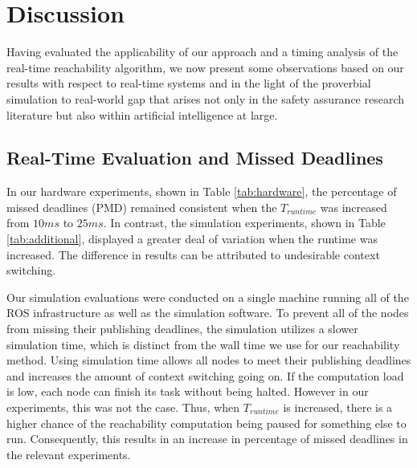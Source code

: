 \documentclass[manuscript,screen,review]{acmart}
\begin{document}
\section{Discussion}

Having evaluated the applicability of our approach and a timing analysis of the real-time reachability algorithm, we now present some observations based on our results with respect to real-time systems and in the light of the proverbial simulation to real-world gap  that arises not only in the safety assurance research literature but also within artificial intelligence at large.



\subsection{Real-Time Evaluation and Missed Deadlines} %

In our hardware experiments, shown in Table \ref{tab:hardware}, the percentage of missed deadlines (PMD) remained consistent when the $T_{runtime}$ was increased from $10ms$ to $25ms$. In contrast, the simulation experiments, shown in Table \ref{tab:additional}, displayed a greater deal of variation when the runtime was increased. The difference in results can be attributed to undesirable context switching. 

Our simulation evaluations were conducted on a single machine running all of the ROS infrastructure as well as the simulation software. To prevent all of the nodes from missing their publishing deadlines, the simulation utilizes a slower simulation time, which is distinct from the wall time we use for our reachability method. Using simulation time allows all nodes to meet their publishing deadlines and increases the amount of context switching going on. If the computation load is low, each node can finish its task without being halted. However in our experiments, this was not the case. Thus, when $T_{runtime}$ is increased, there is a higher chance of the reachability computation being paused for something else to run. Consequently, this  results in an increase in percentage of missed deadlines in the relevant experiments.
\end{document}
